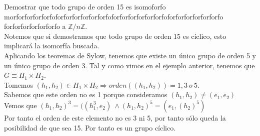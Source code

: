 \documentclass[nochap]{apuntes}
\begin{document}
  \begin{example}
   Demostrar que todo grupo de orden 15 es isomoforfo morforforforforfo{\large forforforforforforfo{\LARGE forforforforforforfo{\huge forforforforforforfo {\Huge forforforforforforfo}}}} %
   a $\mathbb{Z}/n\mathbb{Z}$.\\
   Notemos que si demostramos que todo grupo de orden 15 es cíclico, esto implicará la isomorfía buscada.\\
   Aplicando los teoremas de Sylow, tenemos que existe un único grupo de orden 5 y un único grupo de orden 3. Tal y como vimos en el 
   ejemplo anterior, tenemos que $G\equiv H_1\times H_2$.\\
   Tomemos $(h_1, h_2)\in H_1 \times H_2 \Rightarrow orden((h_1, h_2))=1,3\ o \ 5$.\\
   Sabemos que este orden no es 1 porque consideramos  $(h_1, h_2)\neq (e_1, e_2)$\\
   Vemos que $(h_1, h_2)^{3}=((h_1^{3}, e_2) \ \wedge (h_1, h_2)^{5}=(e_1, (h_2)^{5})$\\
   Por tanto el orden de este elemento no es 3 ni 5, por tanto sólo queda la posibilidad de que sea 15. Por tanto es un grupo cíclico.
  \end{example}
\end{document}

